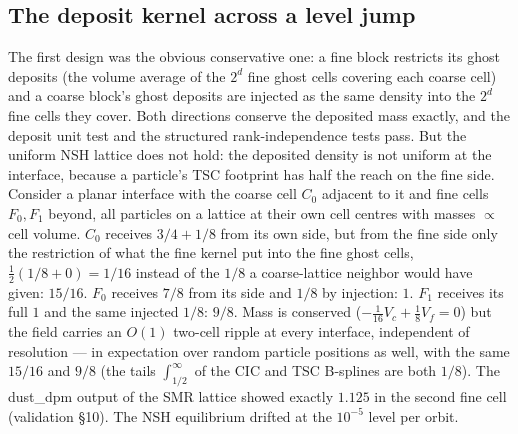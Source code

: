 \documentclass[11pt]{article}
\begin{document}
\subsection{The deposit kernel across a level jump}
\label{sec:phase5:kernel}

The first design was the obvious conservative one: a fine block restricts its ghost
deposits (the volume average of the $2^d$ fine ghost cells covering each coarse cell)
and a coarse block's ghost deposits are injected as the same density into the $2^d$
fine cells they cover. Both directions conserve the deposited mass exactly, and the
deposit unit test and the structured rank-independence tests pass. But the uniform NSH
lattice does not hold: the deposited density is not uniform at the interface, because a
particle's TSC footprint has half the reach on the fine side. Consider a planar
interface with the coarse cell $C_0$ adjacent to it and fine cells $F_0, F_1$ beyond, all
particles on a lattice at their own cell centres with masses $\propto$ cell volume. $C_0$
receives $3/4 + 1/8$ from its own side, but from the fine side only the restriction of
what the fine kernel put into the fine ghost cells, $\tfrac12(1/8 + 0) = 1/16$ instead
of the $1/8$ a coarse-lattice neighbor would have given: $15/16$. $F_0$ receives
$7/8$ from its side and $1/8$ by injection: $1$. $F_1$ receives its full $1$ and the
same injected $1/8$: $9/8$. Mass is conserved ($-\tfrac1{16}V_c + \tfrac18 V_f = 0$) but
the field carries an $O(1)$ two-cell ripple at every interface, independent of
resolution --- in expectation over random particle positions as well, with the same
$15/16$ and $9/8$ (the tails $\int_{1/2}^{\infty}$ of the CIC and TSC B-splines are both
$1/8$). The dust\_dpm output of the SMR lattice showed exactly $1.125$ in the second fine
cell (validation \S10). The NSH equilibrium drifted at the $10^{-5}$ level per orbit.
\end{document}
